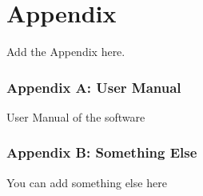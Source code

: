 
\chapter*{Appendix}

Add the Appendix here.


\subsection*{Appendix A: User Manual}

User Manual of the software

\subsection*{Appendix B: Something Else}

You can add something else here

